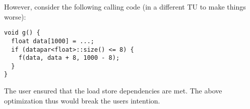 However, consider the following calling code (in a different TU to make things worse):
\smallskip \begin{lstlisting}[style=Vc]
void g() {
  float data[1000] = ...;
  if (datapar<float>::size() <= 8) {
    f(data, data + 8, 1000 - 8);
  }
}
\end{lstlisting}
The user ensured that the load store dependencies are met.
The above optimization thus would break the users intention.

